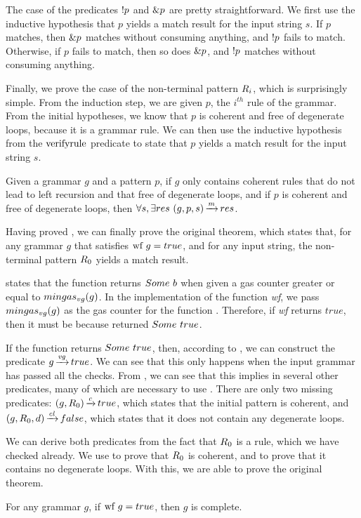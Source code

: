 The case of the predicates $!p$ and $\&p$ are pretty straightforward.
We first use the inductive hypothesis that $p$
yields a match result for the input string $s$.
If $p$ matches,
then $\&p$ matches without consuming anything,
and $!p$ fails to match.
Otherwise, if $p$ fails to match,
then so does $\&p$,
and $!p$ matches without consuming anything.

Finally, we prove the case of the non-terminal pattern $R_{i}$,
which is surprisingly simple.
From the induction step,
we are given $p$, the $i^{th}$ rule of the grammar.
From the initial hypotheses,
we know that $p$ is coherent and free of degenerate loops,
because it is a grammar rule.
We can then use the inductive hypothesis
from the $\text{verifyrule}{}$ predicate to
state that $p$ yields a match result for the input string $s$.
\begin{theorem}
    \label{theorem:wf-correctness-generalized}
    Given a grammar $g$ and a pattern $p$,
    if $g$ only contains coherent rules
    that do not lead to left recursion
    and that free of degenerate loops,
    and if $p$ is coherent
    and free of degenerate loops,
    then $\forall s, \exists res\ \Matches{g}{p}{s}{res}$.
\end{theorem}
Having proved ,
we can finally prove the original theorem,
which states that, for any grammar $g$
that satisfies $\text{wf}\ g = true$,
and for any input string,
the non-terminal pattern $R_{0}$
yields a match result.

 states that
the function \textit{\verifygrammarname{}} returns
$Some\ b$ when given a gas counter greater or equal
to $mingas_{vg}(g)$.
In the implementation of the function \textit{wf},
we pass $mingas_{vg}(g)$ as the gas counter
for the function \textit{\verifygrammarname{}}.
Therefore, if \textit{wf} returns $true$,
then it must be because \textit{\verifygrammarname{}}
returned $Some\ true$.

If the function \textit{\verifygrammarname{}}
returns $Some\ true$,
then,
according to ,
we can construct the predicate $g \operatorname{\xrightarrow{\mathit{vg}}} true$.
We can see that this only happens when
the input grammar has passed
all the checks.
From ,
we can see that this implies in
several other predicates,
many of which are necessary to use
.
There are only two missing predicates:
$(g,R_{0}) \operatorname{\xrightarrow{\mathit{c}}} true$,
which states that the initial pattern is coherent,
and $(g,R_{0},d) \operatorname{\xrightarrow{\mathit{cl}}} false$,
which states that it does not contain any degenerate loops.

We can derive both predicates
from the fact that $R_{0}$ is a rule,
which we have checked already.
We use 
to prove that $R_{0}$ is coherent,
and 
to prove that it contains no degenerate loops.
With this, we are able to prove the original theorem.

\begin{theorem}
    For any grammar $g$,
    if $\text{wf}\ g = true$,
    then $g$ is complete.
\end{theorem}